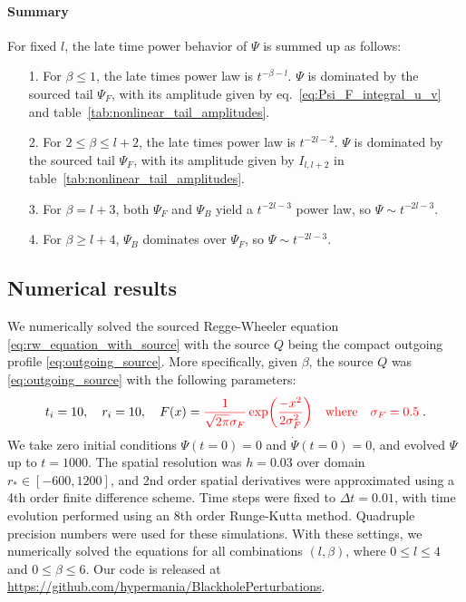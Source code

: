 \documentclass[reprint,aps,physrev,superscriptaddress,10pt,notitlepage,prd,nofootinbib,onecolumn]{revtex4-2}
\newcommand{\tref}[1]{table~\ref{#1}}
\newcommand{\Revise}[1]{{\color{red} #1}}
\begin{document}
\paragraph{Summary}
For fixed $l$, the late time power behavior of $\Psi$ is summed up as follows:
\begin{framed}
\begin{itemize}
\item[1.] For $\beta \leq 1$, the late times power law is $t^{-\beta-l}$.
  $\Psi$ is dominated by the sourced tail $\Psi_F$, with its amplitude given by eq.~\eqref{eq:Psi_F_integral_u_v} and \tref{tab:nonlinear_tail_amplitudes}.
\item[2.] For $2 \leq \beta \leq l+2$, the late times power law is $t^{-2l-2}$.
  $\Psi$ is dominated by the sourced tail $\Psi_F$, with its amplitude given by $I_{l,l+2}$ in \tref{tab:nonlinear_tail_amplitudes}.
\item[3.] For $\beta = l+3$, both $\Psi_F$ and $\Psi_B$ yield a $t^{-2l-3}$ power law, so $\Psi \sim t^{-2l-3}$.
\item[4.] For $\beta \geq l+4$, $\Psi_B$ dominates over $\Psi_F$, so $\Psi \sim t^{-2l-3}$.
\end{itemize}
\end{framed}

\subsection{Numerical results}
\label{sec:sourced_tail_numerical}
We numerically solved the sourced Regge-Wheeler equation \eqref{eq:rw_equation_with_source} with the source $Q$ being the compact outgoing profile \eqref{eq:outgoing_source}.
More specifically, given $\beta$, the source $Q$ was \eqref{eq:outgoing_source} with the following parameters:
\begin{align}
  \label{eq:F_x_definition}
  t_i = 10,\quad r_i = 10,\quad
  F(x) = \Revise{ \frac{1}{\sqrt{2\pi} \sigma_F} \exp(\frac{-x^2}{2 \sigma_F^2}) \qq{where} \sigma_F = 0.5} \;.
\end{align}
We take zero initial conditions $\Psi(t=0)=0$ and $\dot{\Psi}(t=0)=0$, and evolved $\Psi$ up to $t=1000$.
The spatial resolution was $h = 0.03$ over domain $r_* \in [-600,1200]$, and 2nd order spatial derivatives were approximated using a 4th order finite difference scheme.
Time steps were fixed to $\Delta{t} = 0.01$, with time evolution performed using an 8th order Runge-Kutta method.
Quadruple precision numbers were used for these simulations.
With these settings, we numerically solved the equations for all combinations $(l,\beta)$, where $0 \leq l \leq 4$ and $0 \leq \beta \leq 6$.
Our code is released at \url{https://github.com/hypermania/BlackholePerturbations}.
\end{document}
